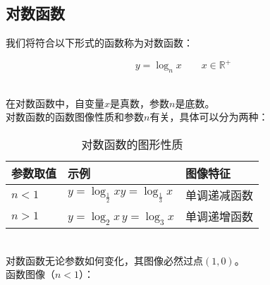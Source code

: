 \documentclass[UTF8]{ctexart}
\begin{document}
\subsection{对数函数}
    我们将符合以下形式的函数称为对数函数：
    \begin{large}
        \begin{equation*}
            y=\log_{n}{x}\qquad x\in\mathbb{R^+}
        \end{equation*}
    \end{large}\\
    在对数函数中，自变量$x$是真数，参数$n$是底数。\\[3mm]
    对数函数的函数图像性质和参数$n$有关，具体可以分为两种：\vspace{5pt}
    \begin{table}[h]
        \begin{center}
            \begin{tabular}{l|l|l}
                \hline
                参数取值&示例&图像特征\\ \hline
                $n<1$\qquad\qquad&$y=\log_{\frac{1}{2}}x$\qquad$y=\log_{\frac{1}{3}}x$&单调递减函数\qquad\qquad\\ \hline
                $n>1$\qquad\qquad&$y=\log_{2}x$\qquad\,$y=\log_{3}x$\qquad\qquad&单调递增函数\\ \hline
            \end{tabular}
            \caption{对数函数的图形性质}
        \end{center}
    \end{table}\\
    对数函数无论参数如何变化，其图像必然过点$(1,0)$。\\[3mm]
    函数图像（$n<1$）：\vspace{-5pt}
\end{document}
